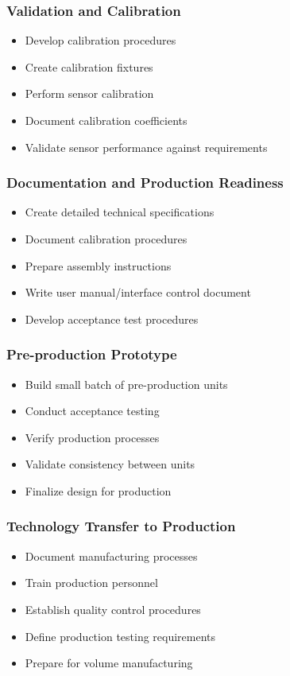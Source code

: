 \subsubsection*{Validation and Calibration}
\begin{itemize}
  \item Develop calibration procedures
  \item Create calibration fixtures
  \item Perform sensor calibration
  \item Document calibration coefficients
  \item Validate sensor performance against requirements
\end{itemize}

\subsubsection*{Documentation and Production Readiness}
\begin{itemize}
  \item Create detailed technical specifications
  \item Document calibration procedures
  \item Prepare assembly instructions
  \item Write user manual/interface control document
  \item Develop acceptance test procedures
\end{itemize}

\subsubsection*{Pre-production Prototype}
\begin{itemize}
  \item Build small batch of pre-production units
  \item Conduct acceptance testing
  \item Verify production processes
  \item Validate consistency between units
  \item Finalize design for production
\end{itemize}

\subsubsection*{Technology Transfer to Production}
\begin{itemize}
  \item Document manufacturing processes
  \item Train production personnel
  \item Establish quality control procedures
  \item Define production testing requirements
  \item Prepare for volume manufacturing
\end{itemize}


